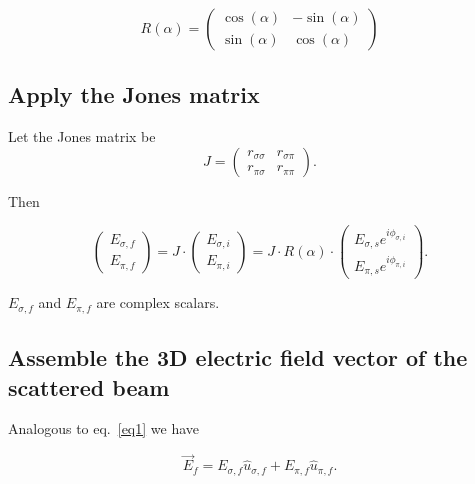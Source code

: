 \documentclass{article}
\begin{document}
\begin{equation}
  R(\alpha)
  =
  \left( \begin{array}{cc}
    \cos(\alpha) & -\sin(\alpha) \\
    \sin(\alpha) & \cos(\alpha)
 \end{array} \right)
\end{equation}

\subsection{Apply the Jones matrix}

Let the Jones matrix be
\begin{equation}
  J = \left(\begin{array}{cc}
    r_{\sigma\sigma} & r_{\sigma\pi} \\
    r_{\pi\sigma} & r_{\pi\pi}
    \end{array}\right).
\end{equation}

Then

\begin{equation}
  \left( \begin{array}{c}
    E_{\sigma,f} \\
    E_{\pi,f}
  \end{array} \right)
  =
  J \cdot
  \left( \begin{array}{c}
    E_{\sigma,i} \\
    E_{\pi,i}
  \end{array} \right)
  =
  J \cdot R(\alpha) \cdot
  \left( \begin{array}{c}
    E_{\sigma,s} e^{i \phi_{\sigma,i}} \\
    E_{\pi,s} e^{i \phi_{\pi,i}}
  \end{array} \right).
\end{equation}

$E_{\sigma,f}$ and $E_{\pi,f}$ are complex scalars.

\subsection{Assemble the 3D electric field vector of the scattered beam}

Analogous to eq.~\ref{eq1} we have

\begin{equation}
  \vec{E}_f
  =
  E_{\sigma,f} \hat{u}_{\sigma,f}
  +
  E_{\pi,f} \hat{u}_{\pi,f}.
\end{equation}
\end{document}

